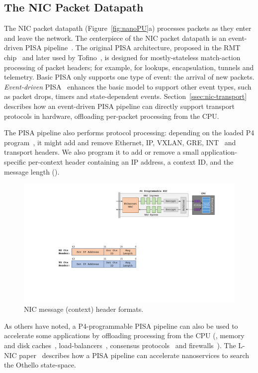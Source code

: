 \subsection{The NIC Packet Datapath}
\label{ssec:nic-datapath}
The NIC packet datapath (Figure~\ref{fig:nanoPU}a) processes packets as they enter and leave the network.
The centerpiece of the NIC packet datapath is an event-driven PISA pipeline~\cite{event-driven-pisa}. 
The original PISA architecture, proposed in the RMT chip~\cite{RMT} and later used by Tofino~\cite{tofino}, is designed for mostly-stateless match-action processing of packet headers; for example, for lookups, encapsulation, tunnels and telemetry.
Basic PISA only supports one type of event: the arrival of new packets. 
{\em Event-driven} PISA~\cite{event-driven-pisa} enhances the basic model to support other event types, such as packet drops, timers and state-dependent events. 
Section~\ref{ssec:nic-transport} describes how an event-driven PISA pipeline can directly support transport protocols in hardware, offloading per-packet processing from the CPU. 

The PISA pipeline also performs protocol processing: depending on the loaded P4 program~\cite{P4}, it might add and remove Ethernet, IP, VXLAN, GRE, INT~\cite{INT} and transport headers. 
We also program it to add or remove a small application-specific per-context header containing an IP address, a context ID, and the message length ().

\begin{figure}
 \includegraphics[width=0.95\linewidth]{./figures/ctx-hdr-fmt}
 \caption{NIC message (context) header formats.}
 \label{fig:app-headers}
\end{figure}

As others have noted, a P4-programmable PISA pipeline can also be used to accelerate some applications by offloading processing from the CPU (\eg, memory and disk caches~\cite{netcache}, load-balancers~\cite{silkroad}, consensus protocols~\cite{netchain} and firewalls~\cite{p4-firewall}). 
The L-NIC paper~\cite{lnic} describes how a PISA pipeline can accelerate nanoservices to search the Othello state-space.
